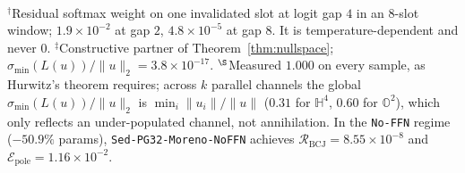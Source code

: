 \documentclass[11pt,a4paper]{article}
\theoremstyle{definition}
\theoremstyle{remark}
\newcommand{\Ha}{\mathbb{H}}
\newcommand{\Oc}{\mathbb{O}}
\begin{document}
\begin{table}[t!]
{\begin{tabular}{@{}lccccccc@{}}
\bottomrule
\end{tabular}}
\\[2pt]
{\footnotesize $^{\dagger}$Residual softmax weight on one invalidated slot at logit gap $4$ in an 8-slot window; $1.9 \times 10^{-2}$ at gap $2$, $4.8 \times 10^{-5}$ at gap $8$. It is temperature-dependent and never $0$. \quad $^{\ddagger}$Constructive partner of Theorem~\ref{thm:nullspace}; $\sigma_{\min}(L(u))/\|u\|_2 = 3.8 \times 10^{-17}$. \quad $^{\S}$Measured $1.000$ on every sample, as Hurwitz's theorem requires; across $k$ parallel channels the global $\sigma_{\min}(L(u))/\|u\|_2$ is $\min_i \|u_i\|/\|u\|$ ($0.31$ for $\Ha^4$, $0.60$ for $\Oc^2$), which only reflects an under-populated channel, not annihilation. In the \texttt{No-FFN} regime ($-50.9\%$ params), \texttt{Sed-PG32-Moreno-NoFFN} achieves $\mathcal{R}_{\mathrm{BCJ}} = 8.55 \times 10^{-8}$ and $\mathcal{E}_{\mathrm{pole}} = 1.16 \times 10^{-2}$.}
\end{table}
\end{document}
